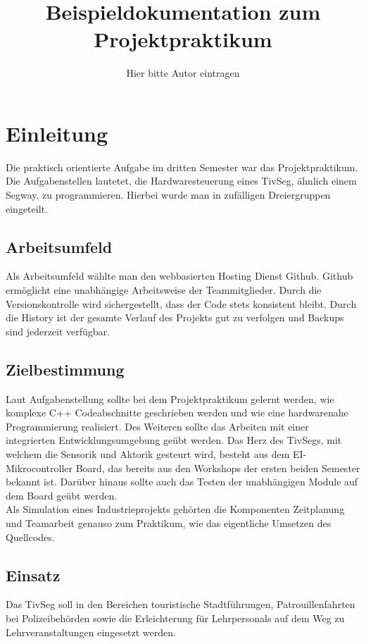 \documentclass[a4paper,10pt,twoside]{report}
\title{Beispieldokumentation zum Projektpraktikum}
\author{Hier bitte Autor eintragen}
\begin{document}

\tableofcontents

\chapter{Einleitung}
Die praktisch orientierte Aufgabe im dritten Semester war das Projektpraktikum. Die Aufgabenstellen  lautetet, die Hardwaresteuerung eines TivSeg, ähnlich einem Segway, zu programmieren. Hierbei wurde man in zufälligen Dreiergruppen eingeteilt. 
\section{Arbeitsumfeld}
Als Arbeitsumfeld wählte man den webbasierten Hosting Dienst Github. Github ermöglicht eine unabhängige Arbeitsweise der Teammitglieder. Durch die Versionskontrolle wird sichergestellt, dass der Code stets konsistent bleibt. Durch die History ist der gesamte Verlauf des Projekts gut zu verfolgen und Backups sind jederzeit verfügbar.

\section{Zielbestimmung}
Laut Aufgabenstellung sollte bei dem Projektpraktikum gelernt werden, wie  komplexe C++ Codeabschnitte geschrieben werden und wie eine hardwarenahe Programmierung realisiert. Des Weiteren sollte das Arbeiten mit einer integrierten Entwicklungsumgebung geübt werden. Das Herz des TivSegs, mit welchem die Sensorik und Aktorik gesteurt wird, besteht aus dem EI-Mikrocontroller Board, das bereits aus den Workshops der ersten beiden Semester bekannt ist. Darüber hinaus sollte auch das Testen der unabhängigen Module auf dem Board geübt werden.\\ Als Simulation eines Industrieprojekts gehörten die Komponenten Zeitplanung und Teamarbeit genauso zum Praktikum, wie das eigentliche Umsetzen des Quellcodes.  

\section{Einsatz}
Das TivSeg soll in den Bereichen touristische Stadtführungen, Patrouillenfahrten bei
Polizeibehörden sowie die Erleichterung für Lehrpersonals auf dem Weg zu Lehrveranstaltungen eingesetzt werden. 
\end{document}
